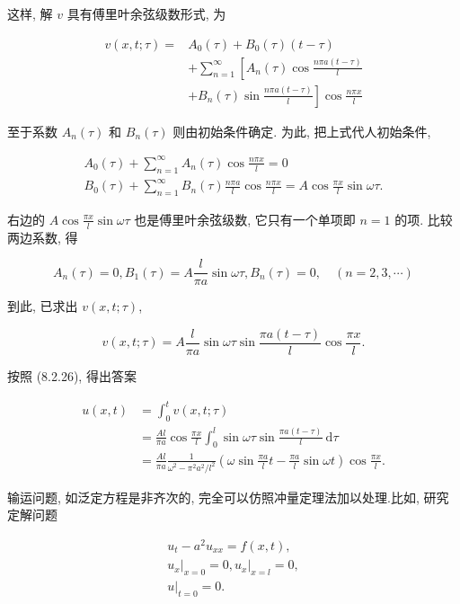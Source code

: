 这样, 解 $v$ 具有傅里叶余弦级数形式, 为

$$
\begin{aligned}
v(x, t ; \tau)= & A_{0}(\tau)+B_{0}(\tau)(t-\tau) \\
& +\sum_{n=1}^{\infty}\left[A_{n}(\tau) \cos \frac{n \pi a(t-\tau)}{l}\right. \\
& \left.+B_{n}(\tau) \sin \frac{n \pi a(t-\tau)}{l}\right] \cos \frac{n \pi x}{l}
\end{aligned}
$$

至于系数 $A_{n}(\tau)$ 和 $B_{n}(\tau)$ 则由初始条件确定. 为此, 把上式代人初始条件,

$$
\begin{gathered}
A_{0}(\tau)+\sum_{n=1}^{\infty} A_{n}(\tau) \cos \frac{n \pi x}{l}=0 \\
B_{0}(\tau)+\sum_{n=1}^{\infty} B_{n}(\tau) \frac{n \pi a}{l} \cos \frac{n \pi x}{l}=A \cos \frac{\pi x}{l} \sin \omega \tau .
\end{gathered}
$$

右边的 $A \cos \frac{\pi x}{l} \sin \omega \tau$ 也是傅里叶余弦级数, 它只有一个单项即 $n=1$ 的项. 比较两边系数, 得

$$
A_{n}(\tau)=0, B_{1}(\tau)=A \frac{l}{\pi a} \sin \omega \tau, B_{n}(\tau)=0, \quad(n=2,3, \cdots)
$$

到此, 已求出 $v(x, t ; \tau)$,

$$
v(x, t ; \tau)=A \frac{l}{\pi a} \sin \omega \tau \sin \frac{\pi a(t-\tau)}{l} \cos \frac{\pi x}{l} .
$$

按照 (8.2.26), 得出答案

$$
\begin{aligned}
u(x, t) & =\int_{0}^{t} v(x, t ; \tau) \\
& =\frac{A l}{\pi a} \cos \frac{\pi x}{l} \int_{0}^{l} \sin \omega \tau \sin \frac{\pi a(t-\tau)}{l} \mathrm{~d} \tau \\
& =\frac{A l}{\pi a} \frac{1}{\omega^{2}-\pi^{2} a^{2} / l^{2}}\left(\omega \sin \frac{\pi a}{l} t-\frac{\pi a}{l} \sin \omega t\right) \cos \frac{\pi x}{l} .
\end{aligned}
$$

输运问题, 如泛定方程是非齐次的, 完全可以仿照冲量定理法加以处理.比如, 研究定解问题

$$
\begin{gathered}
u_{t}-a^{2} u_{x x}=f(x, t), \\
\left.u_{x}\right|_{x=0}=0,\left.u_{x}\right|_{x=l}=0, \\
\left.u\right|_{t=0}=0 .
\end{gathered}
$$

